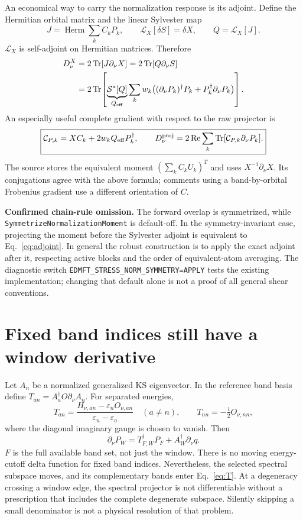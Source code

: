 \documentclass[11pt]{article}
\newcommand{\Tr}{\operatorname{Tr}}
\newcommand{\Rea}{\operatorname{Re}}
\newcommand{\Herm}{\operatorname{Herm}}
\newcommand{\dd}{\partial_\nu}
\newcommand{\Sym}{\mathcal S}
\begin{document}
An economical way to carry the normalization response is its adjoint.
Define the Hermitian orbital matrix and the linear Sylvester map
\begin{equation}
J=\Herm\sum_k C_kP_k,\qquad \mathcal L_X[\delta S]=\delta X,
\qquad Q=\mathcal L_X[J].
\end{equation}
$\mathcal L_X$ is self-adjoint on Hermitian matrices. Therefore
\begin{align}
D^{X}_\nu&=2\Tr[J\dd X]=2\Tr[Q\dd S]\\
 &=2\Tr\!\left[\underbrace{\Sym^*[Q]}_{Q_{\rm eff}}
       \sum_k w_k\big((\dd P_k)^\dagger P_k+P_k^\dagger\dd P_k\big)\right].
\label{eq:adjoint}
\end{align}
An especially useful complete gradient with respect to the raw projector is
\begin{equation}
\boxed{\mathcal C_{P,k}=XC_k+2w_kQ_{\rm eff}P_k^\dagger,\qquad
D^{\rm proj}_\nu=2\Rea\sum_k\Tr[\mathcal C_{P,k}\dd P_k].}\label{eq:rawgrad}
\end{equation}
The source stores the equivalent moment $(\sum_k C_kU_k)^T$ and uses
$X^{-1}\dd X$. Its conjugations agree with the above formula; comments using
a band-by-orbital Frobenius gradient use a different orientation of $C$.

\textbf{Confirmed chain-rule omission.} The forward overlap is symmetrized,
while \texttt{Symmetrize\allowbreak{}Normalization\allowbreak{}Moment} is default-off. In the
symmetry-invariant case, projecting the moment before the Sylvester adjoint
is equivalent to Eq.~\eqref{eq:adjoint}. In general the robust construction
is to apply the exact adjoint after it, respecting active blocks and the
order of equivalent-atom averaging. The diagnostic switch
\texttt{EDMFT\_STRESS\_NORM\_SYMMETRY=APPLY} tests the existing implementation;
changing that default alone is not a proof of all general shear conventions.

\section{Fixed band indices still have a window derivative}
Let $A_n$ be a normalized generalized KS eigenvector. In the reference band
basis define $T_{an}=A_a^\dagger O\dd A_n$. For separated energies,
\begin{equation}
T_{an}=\frac{H_{\nu,an}-\varepsilon_n O_{\nu,an}}
                 {\varepsilon_n-\varepsilon_a}\quad(a\ne n),\qquad
T_{nn}=-\tfrac12O_{\nu,nn},\label{eq:T}
\end{equation}
where the diagonal imaginary gauge is chosen to vanish. Then
\begin{equation}
\dd P_W=T_{F,W}^\dagger P_F+A_W^\dagger\dd q.\label{eq:dP}
\end{equation}
$F$ is the full available band set, not just the window. There is no moving
energy-cutoff delta function for fixed band indices. Nevertheless, the
selected spectral subspace moves, and its complementary bands enter
Eq.~\eqref{eq:T}. At a degeneracy crossing a window edge, the spectral
projector is not differentiable without a prescription that includes the
complete degenerate subspace. Silently skipping a small denominator is not
a physical resolution of that problem.
\end{document}
